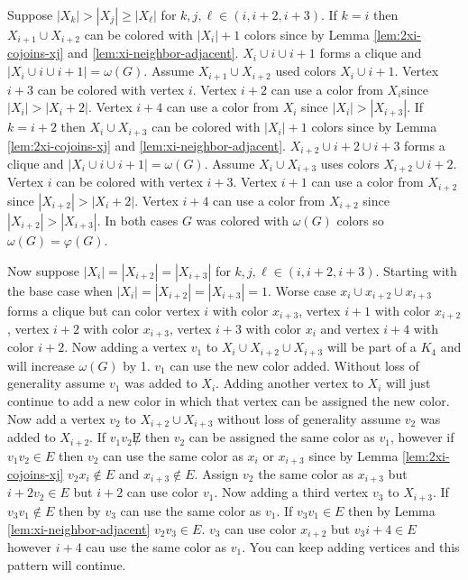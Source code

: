 \documentclass[12pt]{article}
\begin{document}
Suppose $|X_k| > |X_j| \geq |X_\ell|$ for $k,j,\ell \in ({i,i+2,i+3})$. If $k=i$ then $X_{i+1} \cup X_{i+2}$ can be colored with $|X_i| + 1$ colors since by Lemma \ref{lem:2xi-cojoins-xj} and \ref{lem:xi-neighbor-adjacent}. $X_i \cup i \cup i+1$ forms a clique and $|X_i \cup i \cup i+1| = \omega(G)$. Assume $X_{i+1} \cup X_{i+2}$ used colors $X_i \cup i+1$. Vertex $i+3$ can be colored with vertex $i$. Vertex $i+2$ can use a color from $X_i$since $|X_i| > |X_i+2|$. Vertex $i+4$ can use a color from $X_i$ since $|X_i| > |X_{i+3}|$. If $k=i+2$ then $X_{i} \cup X_{i+3}$ can be colored with $|X_i| + 1$ colors since by Lemma \ref{lem:2xi-cojoins-xj} and \ref{lem:xi-neighbor-adjacent}. $X_{i+2} \cup i+2 \cup i+3$ forms a clique and $|X_i \cup i \cup i+1| = \omega(G)$. Assume $X_{i} \cup X_{i+3}$ uses colors $X_{i+2} \cup i+2$. Vertex $i$ can be colored with vertex $i+3$. Vertex $i+1$ can use a color from $X_{i+2}$ since $|X_{i+2}| > |X_i+2|$. Vertex $i+4$ can use a color from $X_{i+2}$ since $|X_{i+2}| > |X_{i+3}|$. In both cases $G$ was colored with $\omega(G)$ colors so $\omega(G) = \varphi(G)$.

Now suppose $|X_i| = |X_{i+2}| = |X_{i+3}|$ for $k,j,\ell \in ({i,i+2,i+3})$. Starting with the base case when $|X_i| = |X_{i+2}| = |X_{i+3}| = 1$. Worse case $x_i \cup x_{i+2} \cup x_{i+3}$ forms a clique but can color vertex $i$ with color $x_{i+3}$, vertex $i+1$ with color $x_{i+2}$, vertex $i+2$ with color $x_{i+3}$, vertex $i+3$ with color $x_i$ and vertex $i+4$ with color $i+2$. Now adding a vertex $v_1$ to $X_i \cup X_{i+2} \cup X_{i+3}$ will be part of a $K_4$ and will increase $\omega(G)$ by 1. $v_1$ can use the new color added. Without loss of generality assume $v_1$ was added to $X_i$. Adding another vertex to $X_i$ will just continue to add a new color in which that vertex can be assigned the new color. Now add a vertex $v_2$ to $X_{i+2} \cup X_{i+3}$ without loss of generality assume $v_2$ was added to $X_{i+2}$. If $v_1v_2 \not E$ then $v_2$ can be assigned the same color as $v_1$, however if $v_1v_2 \in E$ then $v_2$ can use the same color as $x_i$ or $x_{i+3}$ since by Lemma \ref{lem:2xi-cojoins-xj} $v_2x_i \not \in E$ and $x_{i+3} \not \in E$. Assign $v_2$ the same color as $x_{i+3}$ but $i+2v_2 \in E$ but $i+2$ can use color $v_1$. Now adding a third vertex $v_3$ to $X_{i+3}$. If $v_3v_1 \not \in E$ then by $v_3$ can use the same color as $v_1$. If $v_3v_1 \in E$ then by Lemma \ref{lem:xi-neighbor-adjacent} $v_2v_3 \in E$. $v_3$ can use color $x_{i+2}$ but $v_3i+4 \in E$ however $i+4$ cau use the same color as $v_1$. You can keep adding vertices and this pattern will continue.
\end{document}
